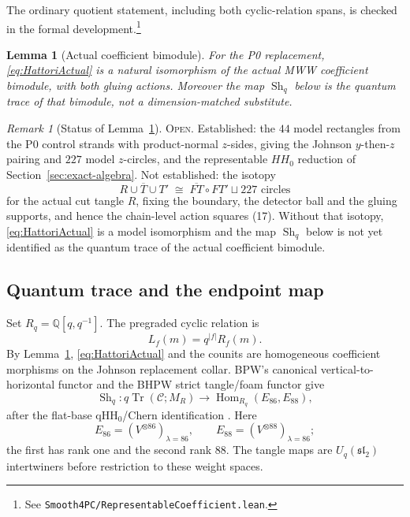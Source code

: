 \documentclass[11pt]{amsart}
\newtheorem{lemma}[theorem]{Lemma}
\theoremstyle{definition}
\theoremstyle{remark}
\newtheorem{remark}[theorem]{Remark}
\newcommand{\Q}{\mathbb{Q}}
\newcommand{\Open}{\textnormal{\textsc{Open}}}
\begin{document}
The ordinary quotient statement, including both cyclic-relation spans, is
checked in the formal development.\footnote{See
\texttt{Smooth4PC/RepresentableCoefficient.lean}.}

\begin{lemma}[Actual coefficient bimodule]\label{lem:C1}
For the P0 replacement, \eqref{eq:HattoriActual} is a natural isomorphism of
the actual MWW coefficient bimodule, with both gluing actions.  Moreover the
map \(\operatorname{Sh}_q\) below is the quantum trace of that bimodule, not a
dimension-matched substitute.
\end{lemma}

\begin{remark}[Status of Lemma~\ref{lem:C1}]
\Open.  Established: the $44$ model rectangles from the P0 control strands
with product-normal $z$-sides, giving the Johnson $y$-then-$z$ pairing and
$227$ model $z$-circles, and the representable $HH_0$ reduction of
Section~\ref{sec:exact-algebra}.  Not established: the isotopy
\[
R\cup\overline T\cup T'\;\cong\;\overline{FT}\circ FT'\sqcup 227\text{ circles}
\]
for the actual cut tangle $R$, fixing the boundary, the detector ball and
the gluing supports, and hence the chain-level action squares (17).  Without
that isotopy, \eqref{eq:HattoriActual} is a model isomorphism and the map
$\operatorname{Sh}_q$ below is not yet identified as the quantum trace of
the actual coefficient bimodule.
\end{remark}

\subsection{Quantum trace and the endpoint map}

Set $R_q=\Q[q,q^{-1}]$.  The pregraded cyclic relation is
\[
L_f(m)=q^{|f|}R_f(m).
\]
By Lemma~\ref{lem:C1}, \eqref{eq:HattoriActual} and the counits are homogeneous
coefficient morphisms on the Johnson replacement collar.  BPW's canonical vertical-to-horizontal functor and the BHPW strict
tangle/foam functor give
\begin{equation}\label{eq:actualShadow}
\operatorname{Sh}_q:q\operatorname{Tr}(\mathcal C;M_R)
\longrightarrow\operatorname{Hom}_{R_q}(E_{86},E_{88}),
\end{equation}
after the flat-base qHH$_0$/Chern identification
\cite{BeliakovaPutyraWehrli2019,BeliakovaHogancampPutyraWehrli2023}.  Here
\[
E_{86}=(V^{\otimes86})_{\lambda=86},\qquad
E_{88}=(V^{\otimes88})_{\lambda=86};
\]
the first has rank one and the second rank 88.  The tangle maps are
$U_q(\mathfrak{sl}_2)$ intertwiners before restriction to these weight
spaces.
\end{document}
